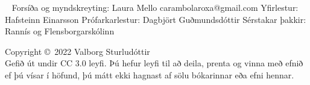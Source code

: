 \documentclass[11pt,fleqn]{book} %
\begin{document}

\begingroup
\thispagestyle{empty} %
\vfill
\endgroup


\newpage
~\vfill
\thispagestyle{empty}
\noindent Forsíða og myndskreyting: Laura Mello carambolaroxa@gmail.com \newline
\noindent Yfirlestur: Hafsteinn Einarsson \newline
\noindent Prófarkarlestur: Dagbjört Guðmundsdóttir \newline
\noindent Sérstakar þakkir: Rannís og Flensborgarskólinn \newline


\noindent Copyright \copyright\ 2022 Valborg Sturludóttir\\ %



\noindent Gefið út undir CC 3.0 leyfi. Þú hefur leyfi til að deila, prenta og vinna með efnið ef þú vísar í höfund, þú mátt ekki hagnast af sölu bókarinnar eða efni hennar.
\end{document}
